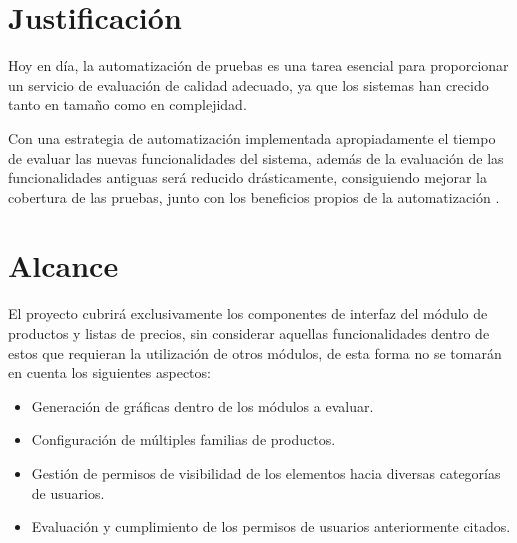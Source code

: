 \section{Justificación}
Hoy en día, la automatización de pruebas es una tarea esencial para proporcionar
un servicio de evaluación de calidad adecuado, ya que los sistemas han crecido
tanto en tamaño como en complejidad.

Con una estrategia de automatización implementada apropiadamente el tiempo de
evaluar las nuevas funcionalidades del sistema, además de la evaluación de las
funcionalidades antiguas será reducido drásticamente, consiguiendo mejorar la
cobertura de las pruebas, junto con los beneficios propios de la automatización
\cite{ahu61}.

\section{Alcance}
El proyecto cubrirá exclusivamente los componentes de interfaz del módulo de
productos y listas de precios, sin considerar aquellas funcionalidades dentro de
estos que requieran la utilización de otros módulos, de esta forma no se tomarán
en cuenta los siguientes aspectos:

\begin{itemize}
\item Generación de gráficas dentro de los módulos a evaluar.
\item Configuración de múltiples familias de productos.
\item Gestión de permisos de visibilidad de los elementos hacia diversas
    categorías de usuarios.
\item Evaluación y cumplimiento de los permisos de usuarios anteriormente
    citados.
\end{itemize}

